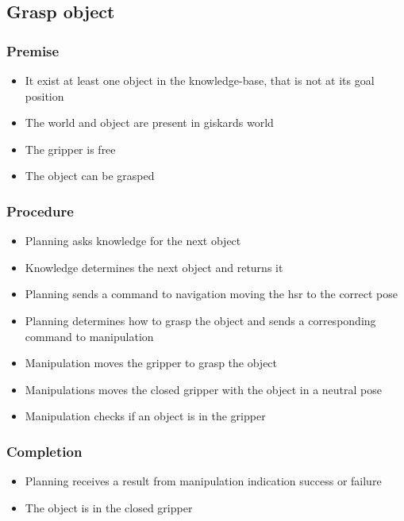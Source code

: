 \documentclass[main.tex]{subfiles}
\begin{document}
	\subsection{Grasp object}
	
	\subsubsection{Premise}
	\begin{itemize}
		\item It exist at least one object in the knowledge-base, that is not at its goal position
		\item The world and object are present in giskards world
		\item The gripper is free
		\item The object can be grasped 
	\end{itemize} 
	
	\subsubsection{Procedure}
	\begin{itemize}			
		\item Planning asks knowledge for the next object
		\item Knowledge determines the next object and returns it
		\item Planning sends a command to navigation moving the hsr to the correct pose
		\item Planning determines how to grasp the object and sends a corresponding command to manipulation
		\item Manipulation moves the gripper to grasp the object
		\item Manipulations moves the closed gripper with the object in a neutral pose
		\item Manipulation checks if an object is in the gripper 				
	\end{itemize}
	
	\subsubsection{Completion}
	\begin{itemize}
		\item Planning receives a result from manipulation indication success or failure
		\item The object is in the closed gripper	
	\end{itemize}
	
\end{document}

